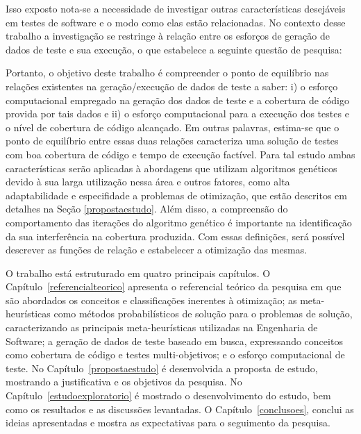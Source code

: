 Isso exposto nota-se a necessidade de investigar outras características desejáveis em testes de software e o modo como elas estão relacionadas. No contexto desse trabalho a investigação se restringe à relação entre os esforços de geração de dados de teste e sua execução, o que estabelece a seguinte questão de pesquisa:

 
\vspace{1.0cm}
\vspace{1.0cm}


Portanto, o objetivo deste trabalho é compreender o ponto de equilíbrio nas relações existentes na geração/execução de dados de teste a saber: i) o esforço computacional empregado na geração dos dados de teste e a cobertura de código provida por tais dados e ii) o esforço computacional para a execução dos testes e o nível de cobertura de código alcançado. Em outras palavras, estima-se que o ponto de equilíbrio entre essas duas relações caracteriza  uma solução de testes com boa cobertura de código e tempo de execução factível. Para tal estudo ambas características serão aplicadas à abordagens que utilizam algoritmos genéticos devido à sua larga utilização nessa área e outros fatores, como alta adaptabilidade e especifidade a problemas de otimização, que estão descritos em detalhes na Seção \ref{propostaestudo}. Além disso, a compreensão do comportamento das iterações do algoritmo genético é importante na identificação da sua interferência na cobertura produzida. Com essas definições, será possível descrever as funções de relação e estabelecer a otimização das mesmas. 


O trabalho está estruturado em quatro principais capítulos. O Capítulo~\ref{referencialteorico} apresenta o referencial teórico da pesquisa em que são abordados os conceitos e classificações inerentes à otimização; as meta-heurísticas como métodos probabilísticos de solução para o problemas de solução, caracterizando as principais meta-heurísticas utilizadas na Engenharia de Software; a geração de dados de teste baseado em busca, expressando conceitos como cobertura de código e testes multi-objetivos; e o esforço computacional de teste. No Capítulo~\ref{propostaestudo} é desenvolvida a proposta de estudo, mostrando a justificativa e os objetivos da pesquisa. No Capítulo~\ref{estudoexploratorio} é mostrado o desenvolvimento do estudo, bem como os resultados e as discussões levantadas. O Capítulo~\ref{conclusoes}, conclui as ideias apresentadas e mostra as expectativas para o seguimento da pesquisa.